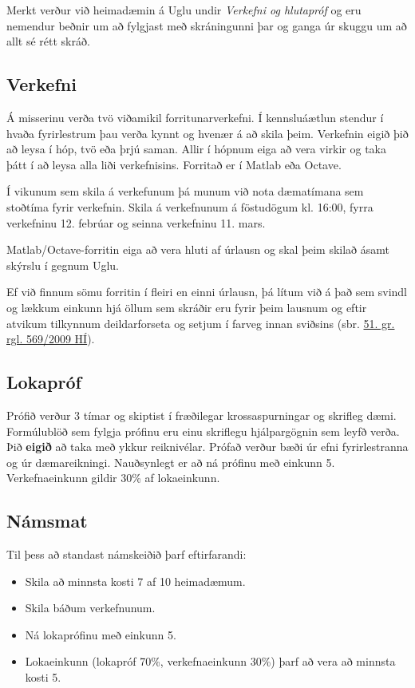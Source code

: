 \documentclass[letterpaper,10pt,icelandic]{sphinxmanual}
\begin{document}
Merkt verður við heimadæmin á Uglu undir \emph{Verkefni og hlutapróf} og eru nemendur beðnir um að fylgjast með skráningunni þar og ganga úr skuggu um að allt sé rétt skráð.


\subsection{Verkefni}
\label{vidauki:verkefni}
Á misserinu verða tvö viðamikil forritunarverkefni.
Í kennsluáætlun stendur í hvaða fyrirlestrum þau verða kynnt og hvenær á að skila þeim. Verkefnin eigið þið að leysa í hóp, tvö eða þrjú saman. Allir í hópnum eiga að vera virkir og taka þátt í að leysa alla liði verkefnisins. Forritað er í Matlab eða Octave.

Í vikunum sem skila á verkefunum þá munum við nota dæmatímana sem stoðtíma fyrir verkefnin. Skila á verkefnunum á föstudögum kl. 16:00, fyrra verkefninu 12. febrúar og seinna verkefninu 11. mars.

Matlab/Octave-forritin eiga að vera hluti af úrlausn og skal þeim skilað ásamt skýrslu í gegnum Uglu.

Ef við finnum sömu forritin í fleiri en einni úrlausn, þá lítum við á það sem svindl og lækkum einkunn hjá öllum sem skráðir eru fyrir þeim lausnum og eftir atvikum tilkynnum deildarforseta og setjum í farveg innan sviðsins (sbr. \href{http://www.hi.is/adalvefur/reglur\_fyrir\_haskola\_islands\#51}{51. gr. rgl. 569/2009 HÍ}).


\subsection{Lokapróf}
\label{vidauki:lokaprof}
Prófið verður 3 tímar og skiptist í fræðilegar krossaspurningar og skrifleg dæmi. Formúlublöð sem fylgja prófinu eru einu
skriflegu hjálpargögnin sem leyfð verða.  Þið \textbf{eigið} að taka með ykkur reiknivélar. Prófað verður bæði úr efni fyrirlestranna og úr dæmareikningi. Nauðsynlegt er að ná prófinu með einkunn 5.  Verkefnaeinkunn gildir
30\% af lokaeinkunn.


\subsection{Námsmat}
\label{vidauki:namsmat}
Til þess að standast námskeiðið þarf eftirfarandi:
\begin{itemize}
\item {} 
Skila að minnsta kosti 7 af 10 heimadæmum.

\item {} 
Skila báðum verkefnunum.

\item {} 
Ná lokaprófinu með einkunn 5.

\item {} 
Lokaeinkunn (lokapróf 70\%, verkefnaeinkunn 30\%) þarf að vera að minnsta kosti 5.

\end{itemize}
\end{document}
